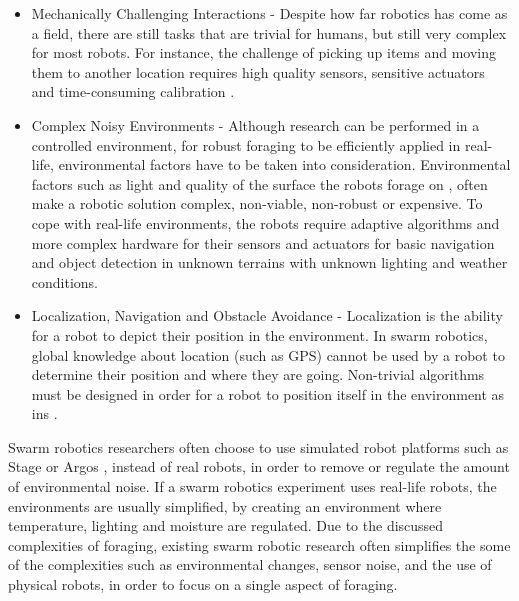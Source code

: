 \begin{itemize}
\item Mechanically Challenging Interactions - Despite how far robotics has come as a field, there are still tasks that are trivial for humans, but still very complex for most robots. For instance, the challenge of picking up items \cite{saxena2008robotic} and moving them to another location requires high quality sensors, sensitive actuators and time-consuming calibration \cite{mondada2005cooperation}. 

\item Complex Noisy Environments - Although research can be performed in a controlled environment, for robust foraging to be efficiently applied in real-life, environmental factors have to be taken into consideration. Environmental factors such as light \cite{browning2005real,jungel2003real} and quality of the surface the robots forage on \cite{trianni2006cooperative}, often make a robotic solution complex, non-viable, non-robust or expensive. To cope with real-life environments, the robots require adaptive algorithms and more complex hardware for their sensors and actuators for basic navigation and object detection in unknown terrains with unknown lighting and weather conditions. 

\item Localization, Navigation and Obstacle Avoidance - Localization is the ability for a robot to depict their position in the environment. In swarm robotics, global knowledge about location (such as GPS) cannot be used by a robot to determine their position and where they are going. Non-trivial algorithms must be designed in order for a robot to position itself in the environment as ins \cite{zhou2012motion,rothermich2004distributed,arkin1992cooperation}. 

\end{itemize}

Swarm robotics researchers often choose to use simulated robot platforms such as Stage \cite{vaughan2008massively} or Argos \cite{pinciroli2011argos}, instead of real robots, in order to remove or regulate the amount of environmental noise. If a swarm robotics experiment uses real-life robots, the environments are usually simplified, by creating an environment where temperature, lighting and moisture are regulated\cite{labella2006division,nouyan2006group}. Due to the discussed complexities of foraging, existing swarm robotic research often simplifies the some of the complexities such as environmental changes, sensor noise, and the use of physical robots, in order to focus on a single aspect of foraging. 

